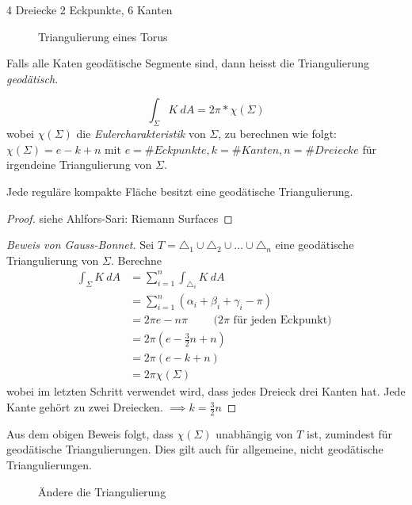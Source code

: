 \documentclass[../main.tex]{subfiles}
\begin{document}
\begin{example}
    4 Dreiecke
    2 Eckpunkte, 6 Kanten
    \begin{figure}[htb]
        \centering
        \def\svgwidth{10em}
        
        \caption{Triangulierung eines Torus}        
    \end{figure}
\end{example}
Falls alle Katen geodätische Segmente sind, dann heisst die Triangulierung \emph{geodätisch}.

\begin{theorem}
    $$\int_{\Sigma}K \ dA = 2 \pi * \chi (\Sigma)$$ wobei $\chi (\Sigma)$ die \emph{Eulercharakteristik} von $\Sigma$, zu berechnen wie folgt:
    $\chi (\Sigma) = e - k + n$ mit $e= \#Eckpunkte, k=\#Kanten, n=\#Dreiecke$ für irgendeine Triangulierung von $\Sigma$.
\end{theorem}

\begin{theorem}
    Jede reguläre kompakte Fläche besitzt eine geodätische Triangulierung.
\end{theorem}
\begin{proof}
    siehe Ahlfors-Sari: Riemann Surfaces
\end{proof}

\begin{proof}[Beweis von Gauss-Bonnet]
    Sei $T= \triangle_1 \cup \triangle_2 \cup \dots \cup \triangle_n$ eine geodätische Triangulierung von $\Sigma$.
    Berechne
    \begin{align*}
        \int_{\Sigma} K \ dA &= \sum_{i=1}^n \int_{\triangle _i} K \ dA \\
        &= \sum_{i=1} ^n (\alpha _i + \beta _i + \gamma _i - \pi) \\
        &= 2 \pi e - n \pi \qquad \text{ ($2 \pi$ für jeden Eckpunkt) } \\
        &= 2 \pi (e - \frac{3}{2}n + n) \\
        &= 2 \pi (e - k + n) \\
        &= 2 \pi \chi (\Sigma)
    \end{align*}wobei im letzten Schritt verwendet wird, dass jedes Dreieck drei Kanten hat.
    Jede Kante gehört zu zwei Dreiecken. $\implies k = \frac{3}{2}n$
\end{proof}

\begin{remark}
    Aus dem obigen Beweis folgt, dass $\chi (\Sigma)$ unabhängig von $T$ ist, zumindest für geodätische Triangulierungen.
    Dies gilt auch für allgemeine, nicht geodätische Triangulierungen.
    \begin{figure}[htb]
        \centering
        \def\svgwidth{20em}
        
        \caption{Ändere die Triangulierung}        
    \end{figure}
\end{remark}
\end{document}
